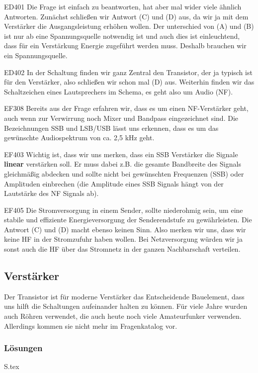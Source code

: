 \documentclass[10pt,a4paper,ngerman]{article}
\theoremstyle{definition}
\theoremstyle{plain}
\theoremstyle{mytheorem}
\theoremstyle{definition}
\newenvironment{ohmchapter}{}
{
  \subsubsection*{Lösungen}
  S\arabic{subsection}.tex}
}
\begin{document}
\begin{sol}{ED401}
 Die Frage ist einfach zu beantworten, hat aber mal wider viele ähnlich Antworten.
 Zunächst schließen wir Antwort (C) und (D) aus, da wir ja mit dem Verstärker die Ausgangsleistung erhöhen wollen. Der unterschied von (A) und (B) ist nur ab eine Spannungsquelle notwendig ist und auch dies ist einleuchtend, dass für ein Verstärkung Energie zugeführt werden muss. Deshalb brauchen wir ein Spannungsquelle.  
\end{sol}

\begin{sol}{ED402}
 In der Schaltung finden wir ganz Zentral den Transistor, der ja typisch ist für den Verstärker, also schließen wir schon mal (D) aus. Weiterhin finden wir das Schaltzeichen eines Lautsprechers im Schema, es geht also um Audio (NF).   
\end{sol}

\begin{sol}{EF308}
  Bereits aus der Frage erfahren wir, dass es um einen NF-Verstärker geht, auch wenn zur Verwirrung noch Mixer und Bandpass eingezeichnet sind. Die Bezeichnungen SSB und LSB/USB lässt uns erkennen, dass es um das gewünschte Audiospektrum von ca. 2,5 kHz geht.
\end{sol}

\begin{sol}{EF403}
 Wichtig ist, dass wir uns merken, dass ein SSB Verstärker die Signale \textbf{linear} verstärken soll. Er muss dabei z.B. die gesamte Bandbreite des Signals gleichmäßig abdecken und sollte nicht bei gewünschten Frequenzen (SSB) oder Amplituden einbrechen (die Amplitude eines SSB Signals hängt von der Lautstärke des NF Signals ab).
\end{sol}

\begin{sol}{EF405}
  Die Stromversorgung in einem Sender, sollte niederohmig sein, um eine stabile und effiziente Energieversorgung der Senderendstufe zu gewährleisten. Die Antwort (C) und (D) macht ebenso keinen Sinn. Also merken wir uns, dass wir keine HF in der Stromzufuhr haben wollen. Bei Netzversorgung würden wir ja sonst auch die HF über das Stromnetz in der ganzen Nachbarschaft verteilen.
\end{sol}

\subsection{Verstärker}
\begin{ohmchapter}
Der Transistor ist für moderne Verstärker das Entscheidende Bauelement, dass uns hilft die Schaltungen aufeinander halten zu können. Für viele Jahre wurden auch Röhren verwendet, die auch heute noch viele Amateurfunker verwenden. Allerdings kommen sie nicht mehr im Fragenkatalog vor.
\end{ohmchapter}  
\end{document}
